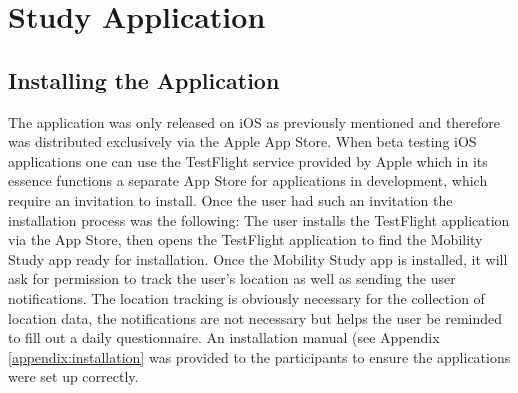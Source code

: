 \section{Study Application}

\subsection{Installing the Application}
The application was only released on iOS as previously mentioned and therefore was distributed exclusively via the Apple App Store. When beta testing iOS applications one can use the TestFlight service provided by Apple which in its essence functions a separate App Store for applications in development, which require an invitation to install. Once the user had such an invitation the installation process was the following: The user installs the TestFlight application via the App Store, then opens the TestFlight application to find the Mobility Study app ready for installation. Once the Mobility Study app is installed, it will ask for permission to track the user's location as well as sending the user notifications. The location tracking is obviously necessary for the collection of location data, the notifications are not necessary but helps the user be reminded to fill out a daily questionnaire. An installation manual (see Appendix \ref{appendix:installation} was provided to the participants to ensure the applications were set up correctly.

